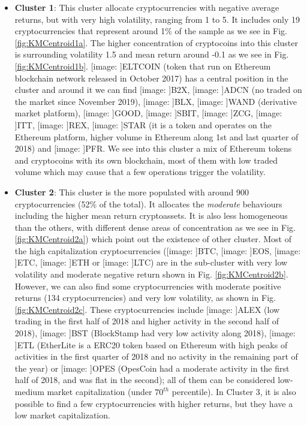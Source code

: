 \documentclass{bmcart}
\def\texttt{[image: ]}
\begin{document}
\begin{itemize}

	
	\item \textbf{Cluster 1}: This cluster allocate cryptocurrencies with negative average returns, but with very high volatility, ranging from 1 to 5. It includes only 19 cryptocurrencies that represent around 1\% of the sample as we see in Fig. \ref{fig:KMCentroid1a}. The higher concentration of cryptocoins into this cluster is surrounding volatility 1.5 and mean return around -0.1 as we see in Fig. \ref{fig:KMCentroid1b}. \texttt{ELTCOIN} (token that run on Ethereum blockchain network released in October 2017) has a central position in the cluster and around it we can find \texttt{B2X}, \texttt{ADCN} (no traded on the market since November 2019), \texttt{BLX}, \texttt{WAND} (derivative market platform), \texttt{GOOD}, \texttt{SBIT}, \texttt{ZCG}, \texttt{ITT}, \texttt{REX}, \texttt{STAR} (it is a token and operates on the Ethereum platform, higher volume in Ethereum along 1st and last quarter of 2018) and \texttt{PFR}. We see into this cluster a mix of Ethereum tokens and cryptocoins with its own blockchain, most of them with low traded volume which may cause that a few operations trigger the volatility. 
	
	\item \textbf{Cluster 2}: This cluster is the more populated with around 900 cryptocurrencies (52\% of the total). It allocates the \textit{moderate} behaviours including the higher mean return cryptoassets. It is also less homogeneous than the others, with different dense areas of concentration as we see in Fig. \ref{fig:KMCentroid2a}) which point out the existence of other cluster. Most of the high capitalization cryptocurrencies (\texttt{BTC}, \texttt{EOS}, \texttt{ETC}, \texttt{ETH} or \texttt{LTC}) are in the sub-cluster with very low volatility and moderate negative return shown in Fig.  \ref{fig:KMCentroid2b}. However, we can also find some cryptocurrencies with moderate  positive returns (134 cryptocurrencies) and very low volatility, as shown in Fig. \ref{fig:KMCentroid2c}. These cryptocurrencies include \texttt{ALEX} (low trading in the first half of 2018 and higher activity in the second half of 2018), \texttt{BST} (BlockStamp had very low activity along 2018), \texttt{ETL} (EtherLite is a ERC20 token based on Ethereum with high peaks of activities in the first quarter of 2018 and no activity in the remaining part of the year) or \texttt{OPES} (OpesCoin had a moderate activity in the first half of 2018, and was flat in the second); all of them can be considered low-medium market capitalization (under $70^{th}$ percentile). In Cluster 3, it is also possible to find a few cryptocurrencies with higher returns, but they have a low market capitalization.
	

\end{itemize}
\end{document}
